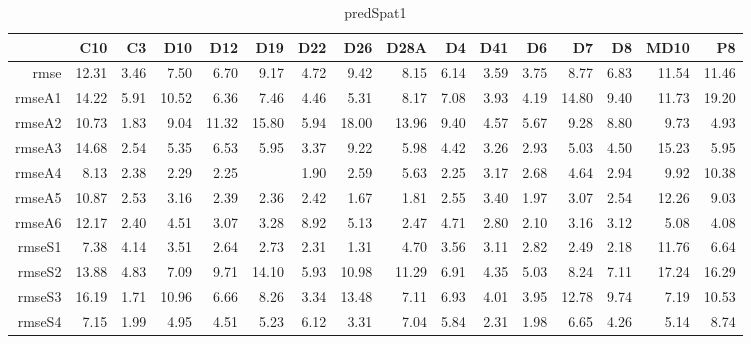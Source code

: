 \begin{table}[H]
\centering
\begin{tabular}{rrrrrrrrrrrrrrrr}
  \hline
 & C10 & C3 & D10 & D12 & D19 & D22 & D26 & D28A & D4 & D41 & D6 & D7 & D8 & MD10 & P8 \\ 
  \hline
rmse & 12.31 & 3.46 & 7.50 & 6.70 & 9.17 & 4.72 & 9.42 & 8.15 & 6.14 & 3.59 & 3.75 & 8.77 & 6.83 & 11.54 & 11.46 \\ 
  rmseA1 & 14.22 & 5.91 & 10.52 & 6.36 & 7.46 & 4.46 & 5.31 & 8.17 & 7.08 & 3.93 & 4.19 & 14.80 & 9.40 & 11.73 & 19.20 \\ 
  rmseA2 & 10.73 & 1.83 & 9.04 & 11.32 & 15.80 & 5.94 & 18.00 & 13.96 & 9.40 & 4.57 & 5.67 & 9.28 & 8.80 & 9.73 & 4.93 \\ 
  rmseA3 & 14.68 & 2.54 & 5.35 & 6.53 & 5.95 & 3.37 & 9.22 & 5.98 & 4.42 & 3.26 & 2.93 & 5.03 & 4.50 & 15.23 & 5.95 \\ 
  rmseA4 & 8.13 & 2.38 & 2.29 & 2.25 &  & 1.90 & 2.59 & 5.63 & 2.25 & 3.17 & 2.68 & 4.64 & 2.94 & 9.92 & 10.38 \\ 
  rmseA5 & 10.87 & 2.53 & 3.16 & 2.39 & 2.36 & 2.42 & 1.67 & 1.81 & 2.55 & 3.40 & 1.97 & 3.07 & 2.54 & 12.26 & 9.03 \\ 
  rmseA6 & 12.17 & 2.40 & 4.51 & 3.07 & 3.28 & 8.92 & 5.13 & 2.47 & 4.71 & 2.80 & 2.10 & 3.16 & 3.12 & 5.08 & 4.08 \\ 
  rmseS1 & 7.38 & 4.14 & 3.51 & 2.64 & 2.73 & 2.31 & 1.31 & 4.70 & 3.56 & 3.11 & 2.82 & 2.49 & 2.18 & 11.76 & 6.64 \\ 
  rmseS2 & 13.88 & 4.83 & 7.09 & 9.71 & 14.10 & 5.93 & 10.98 & 11.29 & 6.91 & 4.35 & 5.03 & 8.24 & 7.11 & 17.24 & 16.29 \\ 
  rmseS3 & 16.19 & 1.71 & 10.96 & 6.66 & 8.26 & 3.34 & 13.48 & 7.11 & 6.93 & 4.01 & 3.95 & 12.78 & 9.74 & 7.19 & 10.53 \\ 
  rmseS4 & 7.15 & 1.99 & 4.95 & 4.51 & 5.23 & 6.12 & 3.31 & 7.04 & 5.84 & 2.31 & 1.98 & 6.65 & 4.26 & 5.14 & 8.74 \\ 
   \hline
\end{tabular}
\caption{predSpat1} 
\end{table}
